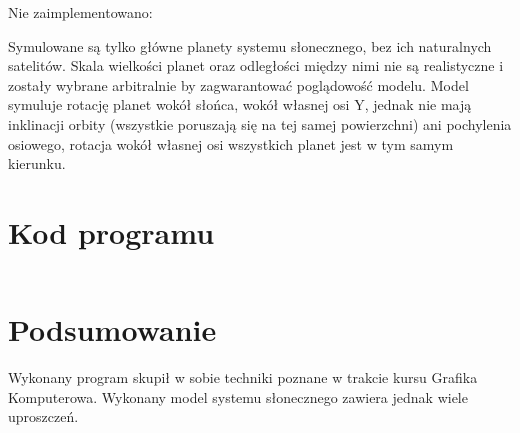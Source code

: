 \documentclass[a4paper]{article}
\begin{document}
Nie zaimplementowano:

Symulowane są tylko główne planety systemu słonecznego, bez ich naturalnych
satelitów. Skala wielkości planet oraz odległości między nimi nie są
realistyczne i zostały wybrane arbitralnie by zagwarantować poglądowość modelu.
Model symuluje rotację planet wokół słońca, wokół własnej osi Y, jednak nie mają
inklinacji orbity (wszystkie poruszają się na tej samej powierzchni) ani
pochylenia osiowego, rotacja wokół własnej osi wszystkich planet jest w tym
samym kierunku.

\section{Kod programu}

\inputminted[breaklines]{C}{../main.cpp}

\section{Podsumowanie}

Wykonany program skupił w sobie techniki poznane w trakcie kursu Grafika
Komputerowa. Wykonany model systemu słonecznego zawiera jednak wiele uproszczeń.
\end{document}

